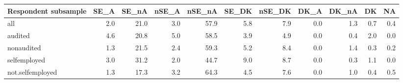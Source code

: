 \begin{table}[ht]
\centering
\begin{tabular}{lrrrrrrrrrr}
  \hline
Respondent subsample & SE\_A & SE\_nA & nSE\_A & nSE\_nA & SE\_DK & nSE\_DK & DK\_A & DK\_nA & DK & NA \\ 
  \hline
all & 2.0 & 21.0 & 3.0 & 57.9 & 5.8 & 7.9 & 0.0 & 1.3 & 0.7 & 0.4 \\ 
  audited & 4.6 & 20.8 & 5.0 & 58.5 & 3.9 & 4.9 & 0.0 & 0.4 & 2.0 & 0.0 \\ 
  nonaudited & 1.3 & 21.5 & 2.4 & 59.3 & 5.2 & 8.4 & 0.0 & 1.4 & 0.3 & 0.2 \\ 
  selfemployed & 3.0 & 31.2 & 2.0 & 44.7 & 9.0 & 8.7 & 0.0 & 0.3 & 1.1 & 0.0 \\ 
  not.selfemployed & 1.3 & 17.3 & 3.2 & 64.3 & 4.5 & 7.6 & 0.0 & 1.0 & 0.4 & 0.5 \\ 
   \hline
\end{tabular}
\end{table}
